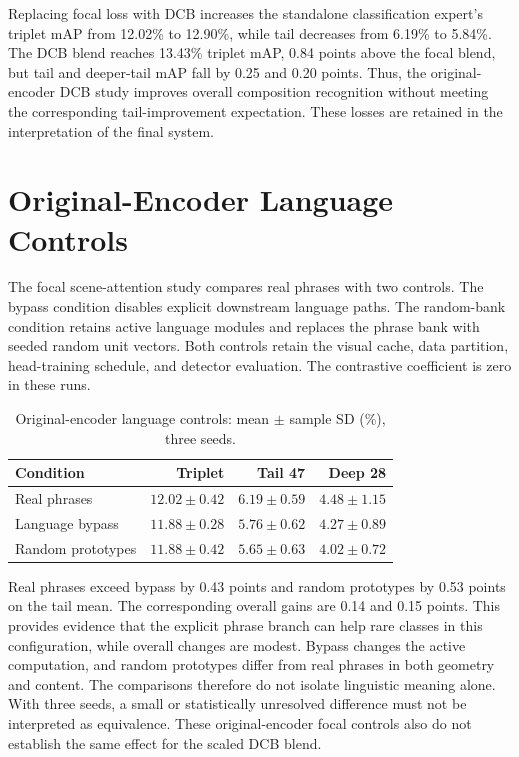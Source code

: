 Replacing focal loss with DCB increases the standalone classification expert's triplet mAP from 12.02\% to 12.90\%, while tail decreases from 6.19\% to 5.84\%. The DCB blend reaches 13.43\% triplet mAP, 0.84 points above the focal blend, but tail and deeper-tail mAP fall by 0.25 and 0.20 points. Thus, the original-encoder DCB study improves overall composition recognition without meeting the corresponding tail-improvement expectation. These losses are retained in the interpretation of the final system.

\section{Original-Encoder Language Controls}

The focal scene-attention study compares real phrases with two controls. The bypass condition disables explicit downstream language paths. The random-bank condition retains active language modules and replaces the phrase bank with seeded random unit vectors. Both controls retain the visual cache, data partition, head-training schedule, and detector evaluation. The contrastive coefficient is zero in these runs.

\begin{table}[htbp]
\centering
\caption{Original-encoder language controls: mean $\pm$ sample SD (\%), three seeds.}
\label{tab:language-controls}
\begin{singlespace}
\begin{tabularx}{\textwidth}{@{}Xrrr@{}}
\toprule
\textbf{Condition} & \textbf{Triplet} & \textbf{Tail 47} & \textbf{Deep 28} \\
\midrule
Real phrases & $12.02\pm0.42$ & $6.19\pm0.59$ & $4.48\pm1.15$ \\
Language bypass & $11.88\pm0.28$ & $5.76\pm0.62$ & $4.27\pm0.89$ \\
Random prototypes & $11.88\pm0.42$ & $5.65\pm0.63$ & $4.02\pm0.72$ \\
\bottomrule
\end{tabularx}
\end{singlespace}
\end{table}

Real phrases exceed bypass by 0.43 points and random prototypes by 0.53 points on the tail mean. The corresponding overall gains are 0.14 and 0.15 points. This provides evidence that the explicit phrase branch can help rare classes in this configuration, while overall changes are modest. Bypass changes the active computation, and random prototypes differ from real phrases in both geometry and content. The comparisons therefore do not isolate linguistic meaning alone. With three seeds, a small or statistically unresolved difference must not be interpreted as equivalence. These original-encoder focal controls also do not establish the same effect for the scaled DCB blend.

